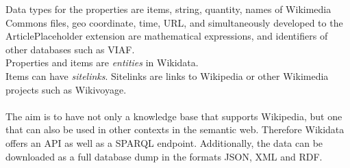 Data types for the properties are items, string, quantity, names of Wikimedia Commons files, geo coordinate, time, URL,  and simultaneously developed to the ArticlePlaceholder extension are mathematical expressions, and identifiers of other databases such as VIAF. \\
Properties and items are \textit{entities} in Wikidata. \\
Items can have \textit{sitelinks}. Sitelinks are links to Wikipedia or other Wikimedia projects such as Wikivoyage. \\
\\
The aim is to have not only a knowledge base that supports Wikipedia, but one that can also be used in other contexts in the semantic web. Therefore Wikidata offers an API as well as a SPARQL endpoint. Additionally, the data can be downloaded as a full database dump in the formats JSON, XML and RDF. 